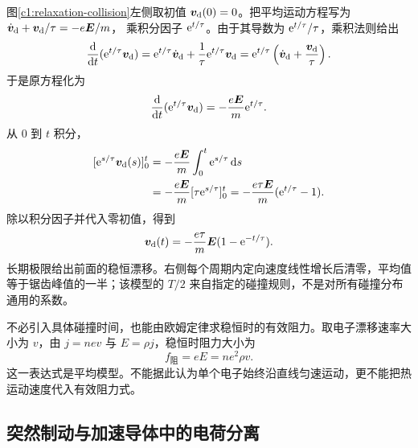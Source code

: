 图\ref{c1:relaxation-collision}左侧取初值 $\bm v_{\rm d}(0)=0$。把平均运动方程写为
$\dot{\bm v}_{\rm d}+\bm v_{\rm d}/\tau=-e\bm E/m$，
乘积分因子 $\mathrm e^{t/\tau}$。由于其导数为 $\mathrm e^{t/\tau}/\tau$，乘积法则给出
\[
 \frac{\mathop{}\!\mathrm d}{\mathop{}\!\mathrm d t}(\mathrm e^{t/\tau}\bm v_{\rm d})
 =\mathrm e^{t/\tau}\dot{\bm v}_{\rm d}
 +\frac1\tau\mathrm e^{t/\tau}\bm v_{\rm d}
 =\mathrm e^{t/\tau}\left(\dot{\bm v}_{\rm d}+\frac{\bm v_{\rm d}}\tau\right).
\]
于是原方程化为
\[
 \frac{\mathop{}\!\mathrm d}{\mathop{}\!\mathrm d t}(\mathrm e^{t/\tau}\bm v_{\rm d})
 =-\frac{e\bm E}{m}\mathrm e^{t/\tau}.
\]
从 $0$ 到 $t$ 积分，
\[
 \begin{aligned}
 [\e^{s/\tau}\bm v_{\rm d}(s)]_0^t
 &=-\frac{e\bm E}{m}\int_0^t\e^{s/\tau}\dd s\\
 &=-\frac{e\bm E}{m}[\tau\e^{s/\tau}]_0^t
 =-\frac{e\tau\bm E}{m}(\e^{t/\tau}-1).
 \end{aligned}
\]
除以积分因子并代入零初值，得到
\[
 \bm v_{\rm d}(t)=-\frac{e\tau}{m}\bm E(1-\mathrm e^{-t/\tau}).
\]
长期极限给出前面的稳恒漂移。右侧每个周期内定向速度线性增长后清零，平均值等于锯齿峰值的一半；该模型的 $T/2$ 来自指定的碰撞规则，不是对所有碰撞分布通用的系数。

不必引入具体碰撞时间，也能由欧姆定律求稳恒时的有效阻力。取电子漂移速率大小为 $v$，由 $j=nev$ 与 $E=\rho j$，稳恒时阻力大小为
\[
 f_{\text{阻}}=eE=ne^2\rho v.
\]
这一表达式是平均模型。不能据此认为单个电子始终沿直线匀速运动，更不能把热运动速度代入有效阻力式。

\subsection{突然制动与加速导体中的电荷分离}

